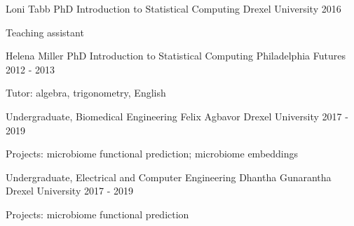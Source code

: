 \begin{cventries}
\cventry
    {Loni Tabb PhD}
    {Introduction to Statistical Computing}
    {Drexel University}
    {2016}
    {\begin{cvitems}
        \item Teaching assistant
    \end{cvitems}}
    
\cventry
    {Helena Miller PhD}
    {Introduction to Statistical Computing}
    {Philadelphia Futures}
    {2012 - 2013}
    {\begin{cvitems}
        \item Tutor: algebra, trigonometry, English 
    \end{cvitems}}

\end{cventries}


\begin{cventries}

\cventry
    {Undergraduate, Biomedical Engineering}
    {Felix Agbavor}
    {Drexel University}
    {2017 - 2019}
    {\begin{cvitems}
        \item Projects: microbiome functional prediction; microbiome embeddings
    \end{cvitems}}

\cventry
    {Undergraduate, Electrical and Computer Engineering}
    {Dhantha Gunarantha}
    {Drexel University}
    {2017 - 2019}
    {\begin{cvitems}
        \item Projects: microbiome functional prediction
    \end{cvitems}}
    
\end{cventries}
    



